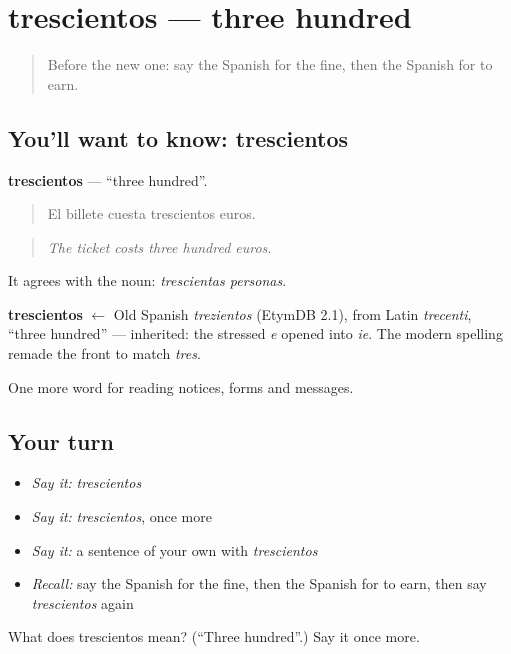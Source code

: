 \section[trescientos]{trescientos — three hundred}

\label{lesson:ES-C477-trescientos}



\begin{quote}
Before the new one: say the Spanish for the fine, then the Spanish for to earn.
\end{quote}

\subsection*{You'll want to know: trescientos}
\textbf{trescientos} — \textquotedblleft{}three hundred\textquotedblright{}.

\begin{quote}
El billete cuesta trescientos euros.
\end{quote}

\begin{quote}
\emph{The ticket costs three hundred euros.}
\end{quote}

It agrees with the noun: \emph{trescientas personas}.

\begin{cousinweb}
\textbf{trescientos} $\leftarrow$ Old Spanish \emph{trezientos} (EtymDB 2.1), from Latin \emph{trecenti}, \textquotedblleft{}three hundred\textquotedblright{} — inherited: the stressed \emph{e} opened into \emph{ie}. The modern spelling remade the front to match \emph{tres}.
\end{cousinweb}

\begin{grammarlens}[title={What you've built}]
One more word for reading notices, forms and messages.
\end{grammarlens}

\subsection*{Your turn}
\begin{itemize}
\raggedright
  \item \emph{Say it:} \emph{trescientos}
  \item \emph{Say it:} \emph{trescientos}, once more
  \item \emph{Say it:} a sentence of your own with \emph{trescientos}
  \item \emph{Recall:} say the Spanish for the fine, then the Spanish for to earn, then say \emph{trescientos} again
\end{itemize}

\begin{tcolorbox}[breakable,colback=teal!4,colframe=teal!35!black,title={Before you move on}]
What does trescientos mean? (\textquotedblleft{}Three hundred\textquotedblright{}.) Say it once more.
\end{tcolorbox}
